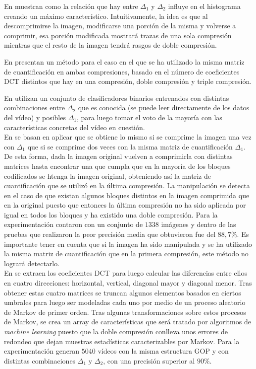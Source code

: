 En \cite{fridrich:2003} muestran como la relación que hay entre $\Delta_1$ y $\Delta_2$ influye en el histograma creando un máximo característico. Intuitivamente, la idea es que al descomprimirse la imagen, modificarse una porción de la misma y volverse a comprimir, esa porción modificada mostrará trazas de una sola compresión mientras que el resto de la imagen tendrá rasgos de doble compresión. 

En \cite{huang:2014} presentan un método para el caso en el que se ha utilizado la misma matriz de cuantificación en ambas compresiones, basado  en el número de coeficientes DCT distintos que hay en una compresión, doble compresión y triple compresión.

En \cite{wang:2013} utilizan un conjunto de clasificadores binarios entrenados con distintas combinaciones entre $\Delta_2$ que es conocida (se puede leer directamente de los datos del vídeo) y posibles $\Delta_1$, para luego tomar el voto de la mayoría con las características concretas del vídeo en cuestión. \\

En \cite{tariang:2017} se basan en aplicar que se obtiene lo mismo si se comprime la imagen una vez con $\Delta_1$ que si se comprime dos veces con la misma matriz de cuantificación $\Delta_1$. De esta forma, dada la imagen original vuelven a comprimirla con distintas matrices hasta encontrar una que cumpla que en la mayoría de los bloques codificados se htenga la imagen original, obteniendo así la matriz de cuantificación que se utilizó en la última compresión. La manipulación se detecta en el caso de que existan algunos bloques distintos en la imagen comprimida que en la original puesto que entonces la última compresión no ha sido aplicada por igual en todos los bloques y ha existido una doble compresión. Para la experimentación contaron con un conjunto de $1338$ imágenes y dentro de las pruebas que realizaron la peor precisión media que obtuvieron fue del $88,7\%$. Es importante tener en cuenta que si la imagen ha sido manipulada y se ha utilizado la misma matriz de cuantificación que en la primera compresión, este método no logrará detectarlo. \\

En \cite{sun:2013} se extraen los coeficientes DCT para luego calcular las diferencias entre ellos en cuatro direcciones: horizontal, vertical, diagonal mayor y diagonal menor. Tras obtener estas cuatro matrices se truncan algunos elementos basados en ciertos umbrales para luego ser modeladas cada uno por medio de un proceso aleatorio de Markov de primer orden. Tras algunas transformaciones sobre estos procesos de Markov, se crea un array de características que será tratado por algoritmos de \textit{machine learning} puesto que la doble compresión conlleva unos errores de redondeo que dejan muestras estadísticas caracterizables por Markov. Para la experimentación generan $5040$ vídeos con la misma estructura GOP y con distintas combinaciones $\Delta_1$ y $\Delta_2$, con una precisión superior al $90\%$. \\

